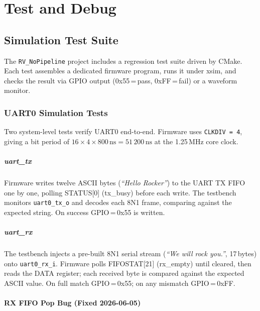 %

\chapter{Test and Debug}

\section{Simulation Test Suite}
\label{sec:simtest01}

The \texttt{RV\_NoPipeline} project includes a
regression test suite driven by CMake.
Each test assembles a dedicated firmware program, runs it under xsim, and checks
the result via GPIO output (0x55\,=\,pass, 0xFF\,=\,fail) or a waveform monitor.

\subsection{UART0 Simulation Tests}
\label{subsec:uartsimtest}

Two system-level tests verify UART0 end-to-end.
Firmware uses \texttt{CLKDIV\,=\,4}, giving a bit period of
$16 \times 4 \times 800\,\text{ns} = 51\,200\,\text{ns}$ at the 1.25\,MHz core clock.

\paragraph{uart\_tx}
Firmware writes twelve ASCII bytes (\textit{``Hello Rocker''}) to the UART TX FIFO
one by one, polling STATUS[0] (tx\_busy) before each write.
The testbench monitors \texttt{uart0\_tx\_o} and decodes each 8N1 frame,
comparing against the expected string.
On success GPIO\,=\,0x55 is written.

\paragraph{uart\_rx}
The testbench injects a pre-built 8N1 serial stream
(\textit{``We will rock you.''}, 17\,bytes) onto \texttt{uart0\_rx\_i}.
Firmware polls FIFOSTAT[21] (rx\_empty) until cleared, then reads the DATA
register; each received byte is compared against the expected ASCII value.
On full match GPIO\,=\,0x55; on any mismatch GPIO\,=\,0xFF.

\subsubsection{RX FIFO Pop Bug (Fixed 2026-06-05)}
\label{subsubsec:rxfifobug}

